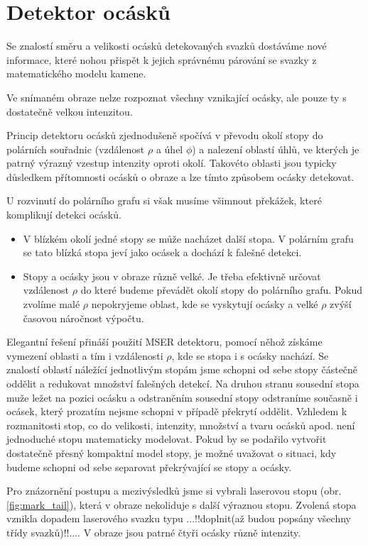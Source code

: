 	
	
	
\section{Detektor ocásků}
	Se znalostí směru a velikosti ocásků detekovaných svazků dostáváme nové informace, které nohou přispět k jejich správnému párování se svazky z matematického modelu kamene.
	
	Ve snímaném obraze nelze rozpoznat všechny vznikající ocásky, ale pouze ty s dostatečně velkou intenzitou.

	Princip detektoru ocásků zjednodušeně spočívá v převodu okolí stopy do polárních souřadnic (vzdálenost $\rho$ a úhel $\phi$) a nalezení oblastí úhlů, ve kterých je patrný výrazný vzestup intenzity oproti okolí. Takovéto oblasti jsou typicky důsledkem přítomnosti ocásků o obraze a lze tímto způsobem ocásky detekovat. 
	
	 U rozvinutí do polárního grafu si však musíme všimnout překážek, které komplikují detekci ocásků.  
	 \begin{itemize}	 	
	 	\item V blízkém okolí jedné stopy se může nacházet další stopa. V polárním grafu se tato blízká stopa jeví jako ocásek a dochází k falešné detekci.	
	 	\item Stopy a ocásky jsou v obraze různě velké. Je třeba efektivně určovat vzdálenost $\rho$ do které budeme převádět okolí stopy do polárního grafu. Pokud zvolíme malé $\rho$ nepokryjeme oblast, kde se vyskytují ocásky a velké $\rho$ zvýší časovou náročnost výpočtu.   	
	\end{itemize}
	
	Elegantní řešení přináší použití MSER detektoru, pomocí něhož získáme vymezení oblasti a tím i vzdálenosti $\rho$, kde se stopa i s ocásky nachází. Se znalostí oblastí náležící jednotlivým stopám jsme schopni od sebe stopy částečně oddělit a redukovat množství falešných detekcí. Na druhou stranu sousední stopa muže ležet na pozici ocásku a odstraněním sousední stopy odstraníme současně i ocásek, který prozatím nejsme schopni v případě překrytí oddělit. Vzhledem k rozmanitosti stop, co do velikosti, intenzity, množství a tvaru ocásků apod. není jednoduché stopu matematicky modelovat. Pokud by se podařilo vytvořit dostatečně přesný kompaktní model stopy, je možné uvažovat o situaci, kdy budeme schopni od sebe separovat překrývající se stopy a ocásky. 
	
 Pro znázornění postupu a mezivýsledků jsme si vybrali laserovou stopu (obr.\ref{fig:mark_tail}), která v obraze nekoliduje s další výraznou stopu. Zvolená stopa vznikla dopadem laserového svazku typu ...!!doplnit(až budou popsány všechny třídy svazků)!!.... V obraze jsou patrné čtyři ocásky různě intenzity. 
	

